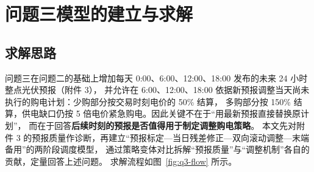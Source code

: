 \section{问题三模型的建立与求解}

\subsection{求解思路}
问题三在问题二的基础上增加每天 0:00、6:00、12:00、18:00 发布的未来 24 小时整点光伏预报（附件 3），
并允许在 6:00、12:00、18:00 依据新预报调整当天尚未执行的购电计划：少购部分按交易时刻电价的 50\% 结算，
多购部分按 150\% 结算，供电缺口仍按 5 倍电价紧急购电。因此关键不在于“用最新预报直接替换原计划”，
而在于回答\textbf{后续时刻的预报是否值得用于制定调整购电策略}。
本文先对附件 3 的预报质量作诊断，再建立“预报标定—当日残差修正—双向滚动调整—末端备用”的两阶段调度模型，
通过策略变体对比拆解“预报质量”与“调整机制”各自的贡献，定量回答上述问题。
求解流程如图~\ref{fig:q3-flow} 所示。

